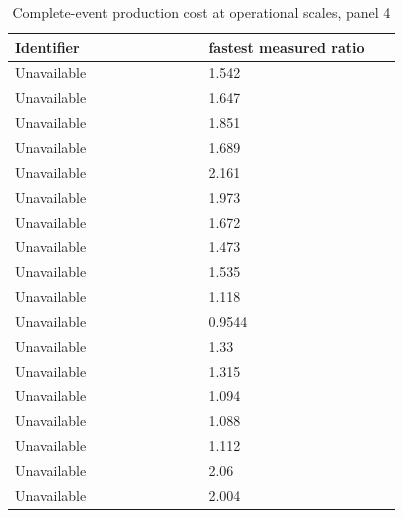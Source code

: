 \begin{longtable}{p{0.4400\linewidth}p{0.4400\linewidth}}
\caption{Complete-event production cost at operational scales, panel 4}\\
\hline
Identifier & fastest measured ratio \\
\hline\endhead
Unavailable & 1.542 \\
Unavailable & 1.647 \\
Unavailable & 1.851 \\
Unavailable & 1.689 \\
Unavailable & 2.161 \\
Unavailable & 1.973 \\
Unavailable & 1.672 \\
Unavailable & 1.473 \\
Unavailable & 1.535 \\
Unavailable & 1.118 \\
Unavailable & 0.9544 \\
Unavailable & 1.33 \\
Unavailable & 1.315 \\
Unavailable & 1.094 \\
Unavailable & 1.088 \\
Unavailable & 1.112 \\
Unavailable & 2.06 \\
Unavailable & 2.004 \\
\end{longtable}
\endgroup
